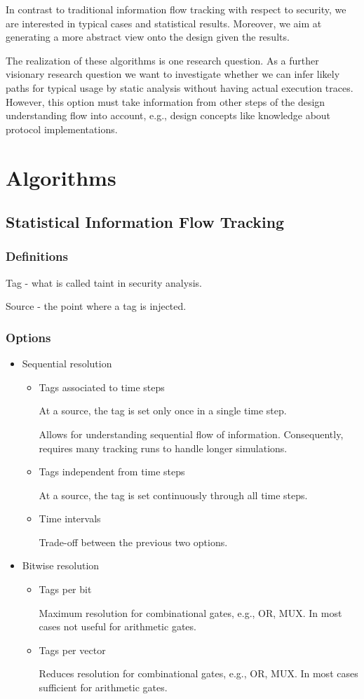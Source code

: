 In contrast to traditional information flow tracking with respect to security, we are interested in typical cases and statistical results. Moreover, we aim at generating a more abstract view onto the design given the results.

The realization of these algorithms is one research question. As a further visionary research question we want to investigate whether we can infer likely paths for typical usage by static analysis without having actual execution traces. However, this option must take information from other steps of the design understanding flow into account, e.g., design concepts like knowledge about protocol implementations.


\section{Algorithms}
\subsection{Statistical Information Flow Tracking}
\subsubsection{Definitions}

Tag - what is called taint in security analysis.

Source - the point where a tag is injected.

\subsubsection{Options}
\begin{itemize}
\item Sequential resolution 
  \begin{itemize}
  \item Tags associated to time steps

  At a source, the tag is set only once in a single time step.

  Allows for understanding sequential flow of information. Consequently, requires many tracking runs to handle longer simulations.
  \item Tags independent from time steps

  At a source, the tag is set continuously through all time steps.
 
  \item Time intervals 

  Trade-off between the previous two options.
  \end{itemize}
\item Bitwise resolution 
  \begin{itemize}
  \item Tags per bit

  Maximum resolution for combinational gates, e.g., OR, MUX. In most cases not useful for arithmetic gates.
  \item Tags per vector

  Reduces resolution for combinational gates, e.g., OR, MUX. In most cases sufficient for arithmetic gates.
  \end{itemize}
\end{itemize}

